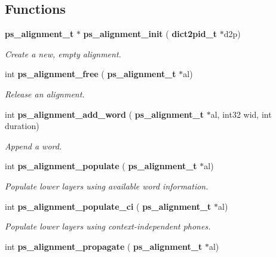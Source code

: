 \subsection*{Functions}
\begin{DoxyCompactItemize}
\item 
\mbox{\label{ps__alignment_8h_abe7668d9a53be1401896623ed42f02be}} 
\textbf{ ps\+\_\+alignment\+\_\+t} $\ast$ \textbf{ ps\+\_\+alignment\+\_\+init} (\textbf{ dict2pid\+\_\+t} $\ast$d2p)
\begin{DoxyCompactList}\small\item\em Create a new, empty alignment. \end{DoxyCompactList}\item 
\mbox{\label{ps__alignment_8h_ab8fa505f155e38d7e6f8b7dbbd070282}} 
int \textbf{ ps\+\_\+alignment\+\_\+free} (\textbf{ ps\+\_\+alignment\+\_\+t} $\ast$al)
\begin{DoxyCompactList}\small\item\em Release an alignment. \end{DoxyCompactList}\item 
\mbox{\label{ps__alignment_8h_ab6264685976a8270971c86deae7a488e}} 
int \textbf{ ps\+\_\+alignment\+\_\+add\+\_\+word} (\textbf{ ps\+\_\+alignment\+\_\+t} $\ast$al, int32 wid, int duration)
\begin{DoxyCompactList}\small\item\em Append a word. \end{DoxyCompactList}\item 
\mbox{\label{ps__alignment_8h_a59e81853dad3d935755dcb309d8cc926}} 
int \textbf{ ps\+\_\+alignment\+\_\+populate} (\textbf{ ps\+\_\+alignment\+\_\+t} $\ast$al)
\begin{DoxyCompactList}\small\item\em Populate lower layers using available word information. \end{DoxyCompactList}\item 
\mbox{\label{ps__alignment_8h_ae17f691c36070955e32a2c987910acde}} 
int \textbf{ ps\+\_\+alignment\+\_\+populate\+\_\+ci} (\textbf{ ps\+\_\+alignment\+\_\+t} $\ast$al)
\begin{DoxyCompactList}\small\item\em Populate lower layers using context-\/independent phones. \end{DoxyCompactList}\item 
\mbox{\label{ps__alignment_8h_adc8ea5411f8500a0affcec636d65fa8d}} 
int \textbf{ ps\+\_\+alignment\+\_\+propagate} (\textbf{ ps\+\_\+alignment\+\_\+t} $\ast$al)

\end{DoxyCompactItemize}
